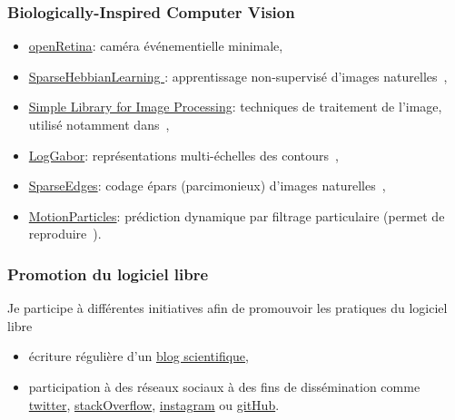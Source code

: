 \documentclass[10pt,french,a4paper,oneside]{article}%
\begin{document}
\subsubsection{Biologically-Inspired Computer Vision} %
\begin{itemize}
	\item \href{https://github.com/laurentperrinet/openRetina}{openRetina}: caméra événementielle minimale,
	\item \href{http://github.com/bicv/SparseHebbianLearning }{SparseHebbianLearning }: apprentissage non-supervisé d'images naturelles~\citep{Perrinet10shl,Perrinet19hulk},
	\item \href{http://github.com/bicv/SLIP}{Simple Library for Image Processing}: techniques de traitement de l'image, utilisé notamment dans~\citep{Perrinet15bicv,Ravello16droplets,PerrinetBednar15,Perrinet15eusipco,Perrinet16EUVIP},
	\item \href{http://github.com/bicv/LogGabor}{LogGabor}: représentations multi-échelles des contours~\citep{Fischer07,Fischer07cv},
	\item \href{http://github.com/bicv/SparseEdges}{SparseEdges}: codage épars (parcimonieux) d'images naturelles~\citep{Perrinet15bicv,PerrinetBednar15},
	\item \href{https://github.com/laurentperrinet/Khoei_2017_PLoSCB}{MotionParticles}: prédiction dynamique par filtrage particulaire (permet de reproduire~\citep{Perrinet12pred,Khoei13jpp,KhoeiMassonPerrinet17}).
\end{itemize}

\subsubsection{Promotion du logiciel libre} %
Je participe à différentes initiatives afin de promouvoir les pratiques du logiciel libre
\begin{itemize}
	\item écriture régulière d'un \href{https://laurentperrinet.github.io/sciblog/}{blog scientifique},
	\item participation à des réseaux sociaux à des fins de dissémination comme \href{https://twitter.com/laurentperrinet}{twitter}, \href{https://stackoverflow.com/users/234547/meduz}{stackOverflow}, \href{https://www.instagram.com/laurentperrinet/}{instagram} ou \href{https://github.com/laurentperrinet}{gitHub}.
\end{itemize}
\end{document}
